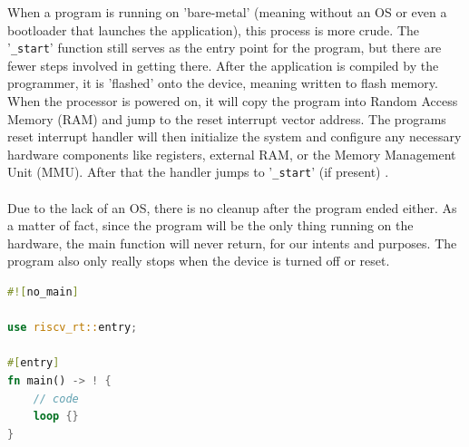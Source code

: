 When a program is running on 'bare-metal' (meaning without an OS or even a bootloader that launches the application), this process is more crude.
The '\lstinline{_start}' function still serves as the entry point for the program, but there are fewer steps involved in getting there.
After the application is compiled by the programmer, it is 'flashed' onto the device, meaning written to flash memory.
When the processor is powered on, it will copy the program into Random Access Memory (RAM) and jump to the reset interrupt vector address.
The programs reset interrupt handler will then initialize the system and configure any necessary hardware components
like registers, external RAM, or the Memory Management Unit (MMU).
After that the handler jumps to '\lstinline{_start}' (if present) \cite{before_main}.\\\\
Due to the lack of an OS, there is no cleanup after the program ended either.
As a matter of fact, since the program will be the only thing running on the hardware,
the main function will never return, for our intents and purposes.
The program also only really stops when the device is turned off or reset.
\\
\begin{minipage}{\textwidth}
\begin{lstlisting}[style=colorEX,language=Rust,caption={Example main function for the pulp-platform},label={code:embedded_main}]
#![no_main]

use riscv_rt::entry;

#[entry]
fn main() -> ! {
    // code
    loop {}
}
\end{lstlisting}
\end{minipage}

